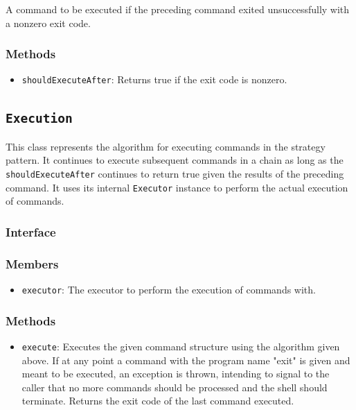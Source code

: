 \documentclass{article}
\begin{document}
  A command to be executed if the preceding command exited
  unsuccessfully with a nonzero exit code.

  \subsubsection{Methods}
  \begin{itemize}
    \item \texttt{shouldExecuteAfter}: Returns true if the exit code is
      nonzero.
  \end{itemize}

  \subsection{\texttt{Execution}}

  This class represents the algorithm for executing commands in the
  strategy pattern.  It continues to execute subsequent commands in a
  chain as long as the \texttt{shouldExecuteAfter} continues to return
  true given the results of the preceding command.  It uses its internal
  \texttt{Executor} instance to perform the actual execution of
  commands.

  \subsubsection{Interface}
  

  \subsubsection{Members}
  \begin{itemize}
    \item \texttt{executor}: The executor to perform the execution of
      commands with.
  \end{itemize}

  \subsubsection{Methods}
  \begin{itemize}
    \item \texttt{execute}: Executes the given command structure using
      the algorithm given above.  If at any point a command with the
      program name "exit" is given and meant to be executed, an
      exception is thrown, intending to signal to the caller that no
      more commands should be processed and the shell should terminate.
      Returns the exit code of the last command executed.
  \end{itemize}
\end{document}
